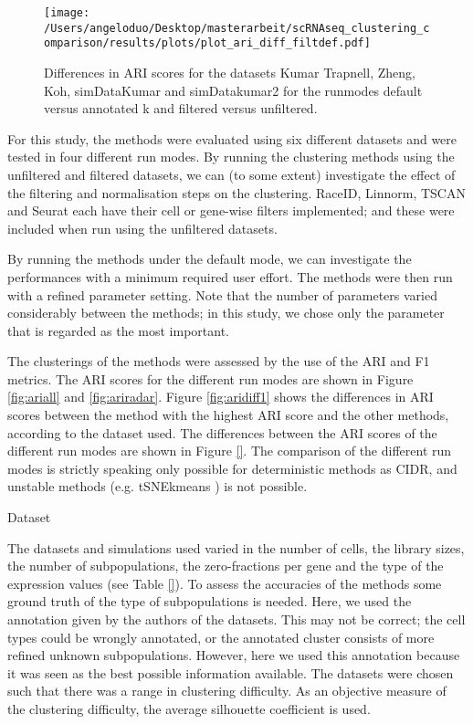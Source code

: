 \documentclass[11pt, a4paper]{article}\usepackage[]{graphicx}\usepackage[]{color}
\begin{document}
\begin{figure}[htp]
\begin{center}
\texttt{[image: /Users/angeloduo/Desktop/masterarbeit/scRNAseq\_clustering\_comparison/results/plots/plot\_ari\_diff\_filtdef.pdf]}
\caption{Differences in ARI scores for the datasets Kumar Trapnell, Zheng, Koh, simDataKumar and simDatakumar2 for the runmodes default versus annotated k and filtered versus unfiltered.}
\label{fig:diff}
\end{center}
\end{figure}

For this study, the methods were evaluated using six different datasets and were tested in four different run modes. By running the clustering methods using the unfiltered and filtered datasets, we can (to some extent) investigate the effect of the filtering and normalisation steps on the clustering. RaceID, Linnorm, TSCAN and Seurat each have their cell or gene-wise filters implemented; and these were included when run using the unfiltered datasets. 

By running the methods under the default mode, we can investigate the performances with a minimum required user effort. The methods were then run with a refined parameter setting. Note that the number of parameters varied considerably between the methods; in this study, we chose only the parameter that is regarded as the most important.

The clusterings of the methods were assessed by the use of the ARI and F1 metrics. The ARI scores for the different run modes are shown in Figure \ref{fig:ariall} and \ref{fig:ariradar}.  Figure \ref{fig:aridiff1} shows the differences in ARI scores between the method with the highest ARI score and the other methods, according to the dataset used. The differences between the ARI scores of the different run modes are shown in Figure \ref{}. The comparison of the different run modes is strictly speaking only possible for deterministic methods as CIDR, and unstable methods (e.g. tSNEkmeans ) is not possible.  


Dataset

The datasets and simulations used varied in the number of cells, the library sizes, the number of subpopulations, the zero-fractions per gene and the type of the expression values (see Table \ref{}). To assess the accuracies of the methods some ground truth of the type of subpopulations is needed. Here, we used the annotation given by the authors of the datasets. This may not be correct; the cell types could be wrongly annotated, or the annotated cluster consists of more refined unknown subpopulations. However, here we used this annotation because it was seen as the best possible information available.
The datasets were chosen such that there was a range in clustering difficulty. As an objective measure of the clustering difficulty, the average silhouette coefficient is used. 
\end{document}
